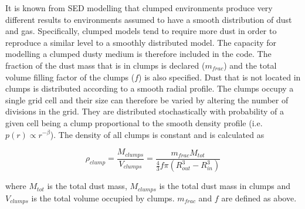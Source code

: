 \documentclass[useAMS,usenatbib,usegraphicx]{mnras}
\begin{document}
It is known from SED modelling that clumped environments produce very different results to environments assumed to have a smooth distribution of dust and gas.  Specifically, clumped models tend to require more dust in order to reproduce a similar level to a smoothly distributed model.  The capacity for modelling a clumped dusty medium is therefore included in the code.  The fraction of the dust mass that is in clumps is declared ($m_{frac}$) and the total volume filling factor of the clumps ($f$) is also specified.  Dust that is not located in clumps is distributed according to a smooth radial profile.  The clumps occupy  a single grid cell and their size can therefore be varied by altering the number of divisions in the grid.  They are distributed stochastically with probability of a given cell being a clump proportional to the smooth density profile (i.e. $p(r) \propto r^{-\beta}$).  The density of all clumps is constant and is calculated as 

\begin{equation}
\rho_{clump}=\frac{M_{clumps}}{V_{clumps}}=\frac{m_{frac}M_{tot}}{\frac{4}{3} f\pi (R_{out}^{3}-R_{in}^{3} )}
\end{equation}

\noindent where $M_{tot}$ is the total dust mass, $M_{clumps}$ is the total dust mass in clumps and $V_{clumps}$ is the total volume occupied by clumps.  $m_{frac}$ and $f$ are defined as above.
\end{document}
